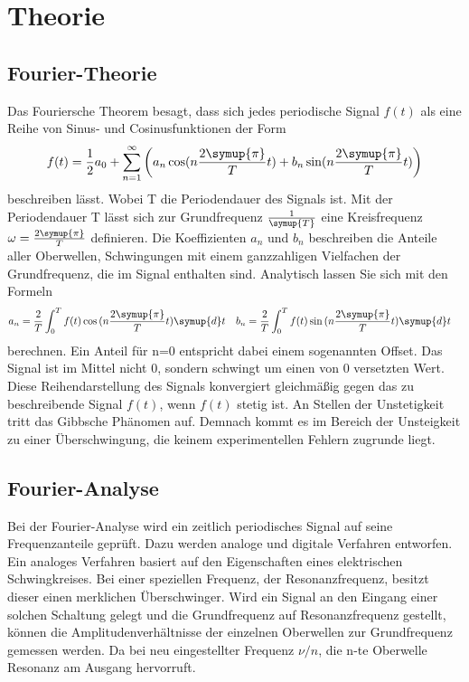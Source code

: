 \section{Theorie}
\label{sec:Theorie}
\subsection{Fourier-Theorie}
Das Fouriersche Theorem besagt, dass sich jedes periodische
Signal $f(t)$ als eine Reihe von Sinus- und Cosinusfunktionen der Form
\begin{equation}
    \label{eqn:Fourier-Reihe}
    f(t)=\frac{1}{2}a_0+\sum_{n=1}^{\infty}\left(a_n \cos(n\frac{2\symup{\pi}}{T}t)+b_n \sin(n\frac{2\symup{\pi}}{T}t)\right)
\end{equation}
beschreiben lässt. Wobei T die Periodendauer des Signals ist.
Mit der Periodendauer T lässt sich zur Grundfrequenz $\frac{1}{\symup{T}}$ eine Kreisfrequenz $\omega=\frac{2\symup{\pi}}{T}$
definieren. Die Koeffizienten $a_n$ und $b_n$ beschreiben die Anteile aller
Oberwellen, Schwingungen mit einem ganzzahligen Vielfachen der Grundfrequenz,
die im Signal enthalten sind. Analytisch lassen Sie sich mit den Formeln
\begin{align}
    a_n & =\frac{2}{T}\int_0^Tf(t)\cos{(n\frac{2\symup{\pi}}{T}t)}\symup{d}t &
    b_n & =\frac{2}{T}\int_0^{T}f(t)\sin{(n\frac{2\symup{\pi}}{T}t)}\symup{d}t
    \label{eqn:Koeffizienten}
\end{align}
berechnen. Ein Anteil für n=0 entspricht dabei einem sogenannten Offset.
Das Signal ist im Mittel nicht 0, sondern schwingt um einen von 0
versetzten Wert.\\

\noindent Diese Reihendarstellung des Signals konvergiert gleichmäßig
gegen das zu beschreibende Signal $f(t)$, wenn $f(t)$ stetig ist. An Stellen der Unstetigkeit
tritt das Gibbsche Phänomen auf. Demnach kommt es im Bereich der Unsteigkeit zu einer
Überschwingung, die keinem experimentellen Fehlern zugrunde liegt.
\cite{V351}
\subsection{Fourier-Analyse}
Bei der Fourier-Analyse wird ein zeitlich periodisches Signal auf
seine Frequenzanteile geprüft. Dazu werden analoge und digitale Verfahren entworfen.
Ein analoges Verfahren basiert auf den Eigenschaften eines elektrischen Schwingkreises. Bei einer speziellen Frequenz,
der Resonanzfrequenz, besitzt dieser einen merklichen Überschwinger. Wird ein Signal an den Eingang einer solchen Schaltung
gelegt und die Grundfrequenz auf Resonanzfrequenz gestellt, können die Amplitudenverhältnisse der einzelnen Oberwellen zur Grundfrequenz gemessen werden.
Da bei neu eingestellter Frequenz $\nu/n$, die n-te Oberwelle Resonanz am Ausgang hervorruft.\\

